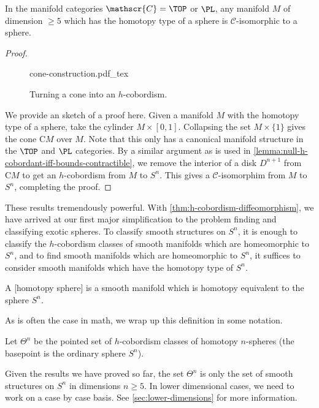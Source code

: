 \begin{corollary}\label{thm:generalized-poincare-smale}
	In the manifold categories $\mathscr{C}=\TOP$ or $\PL$, any manifold $M$ of dimension $\geq 5$ which has the homotopy type of a sphere is $\mathscr{C}$-isomorphic to a sphere.	
\end{corollary}
\begin{proof}
	\begin{figure}[ht]
		\centering
		{cone-construction.pdf_tex}
		\caption{Turning a cone into an $h$-cobordism.}
	\end{figure}

	We provide an sketch of a proof here. Given a manifold $M$ with the homotopy type of a sphere, take the cylinder $M\times [0,1]$. Collapsing the set $M\times \{1\}$ gives the cone $\mathrm{C}M$ over $M$. Note that this only has a canonical manifold structure in the $\TOP$ and $\PL$ categories. By a similar argument as is used in \cref{lemma:null-h-cobordant-iff-bounds-contractible}, we remove the interior of a disk $D^{n+1}$ from $\mathrm{C}M$ to get an $h$-cobordism from $M$ to $S^{n}$. This gives a $\mathscr{C}$-isomorphim from $M$ to $S^n$, completing the proof.
\end{proof}

These results tremendously powerful. With \cref{thm:h-cobordism-diffeomorphism}, we have arrived at our first major simplification to the problem finding and classifying exotic spheres. To classify smooth structures on $S^n$, it is enough to classify the $h$-cobordism classes of smooth manifolds which are homeomorphic to $S^n$, and to find smooth manifolds which are homeomorphic to $S^n$, it suffices to consider smooth manifolds which have the homotopy type of $S^n$.

\begin{definition}
	A [homotopy sphere] is a smooth manifold which is homotopy equivalent to the sphere $S^n$.
\end{definition}

As is often the case in math, we wrap up this definition in some notation.

\begin{definition}
	Let $\Theta^n$ be the pointed set of $h$-cobordism classes of homotopy $n$-spheres (the basepoint is the ordinary sphere $S^n$).
\end{definition}

\begin{remark}
	Given the results we have proved so far, the set $\Theta^n$ is only the set of smooth structures on $S^n$ in dimensions $n\geq 5$. In lower dimensional cases, we need to work on a case by case basis. See \cref{sec:lower-dimensions} for more information.
\end{remark}



